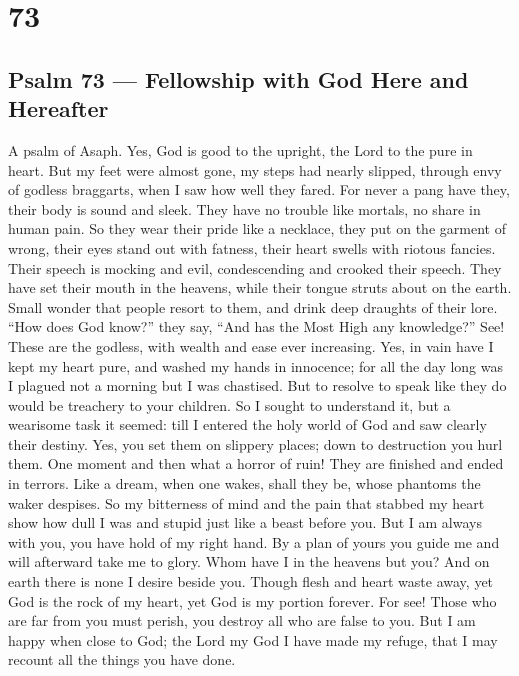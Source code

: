 \hypertarget{section-72}{%
\section{73}\label{section-72}}

\hypertarget{psalm-73-fellowship-with-god-here-and-hereafter}{%
\subsection{Psalm 73 --- Fellowship with God Here and
Hereafter}\label{psalm-73-fellowship-with-god-here-and-hereafter}}

A psalm of Asaph.  Yes, God is good to the upright, the Lord
to the pure in heart.  But my feet were almost gone, my
steps had nearly slipped,  through envy of godless
braggarts, when I saw how well they fared.  For never a pang
have they, their body is sound and sleek.  They have no
trouble like mortals, no share in human pain.  So they wear
their pride like a necklace, they put on the garment of wrong,
 their eyes stand out with fatness, their heart swells with
riotous fancies.  Their speech is mocking and evil,
condescending and crooked their speech.  They have set their
mouth in the heavens, while their tongue struts about on the earth.
 Small wonder that people resort to them, and drink deep
draughts of their lore.  ``How does God know?'' they say,
``And has the Most High any knowledge?''  See! These are
the godless, with wealth and ease ever increasing.  Yes, in
vain have I kept my heart pure, and washed my hands in innocence;
 for all the day long was I plagued not a morning but I was
chastised.  But to resolve to speak like they do would be
treachery to your children.  So I sought to understand it,
but a wearisome task it seemed:  till I entered the holy
world of God and saw clearly their destiny.  Yes, you set
them on slippery places; down to destruction you hurl them.
 One moment and then what a horror of ruin! They are
finished and ended in terrors.  Like a dream, when one
wakes, shall they be, whose phantoms the waker despises. 
So my bitterness of mind and the pain that stabbed my heart
 show how dull I was and stupid just like a beast before
you.  But I am always with you, you have hold of my right
hand.  By a plan of yours you guide me and will afterward
take me to glory.  Whom have I in the heavens but you? And
on earth there is none I desire beside you.  Though flesh
and heart waste away, yet God is the rock of my heart, yet God is my
portion forever.  For see! Those who are far from you must
perish, you destroy all who are false to you.  But I am
happy when close to God; the Lord my God I have made my refuge, that I
may recount all the things you have done.

